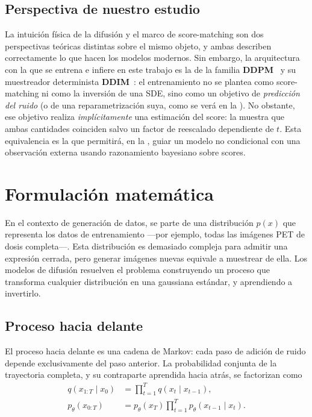 \subsection{Perspectiva de nuestro estudio}
\label{subsec:aplica-hoy}

La intuición física de la difusión y el marco de score-matching son
dos perspectivas teóricas distintas sobre el mismo objeto, y ambas
describen correctamente lo que hacen los modelos modernos. Sin
embargo, la arquitectura con la que se entrena e infiere en
este trabajo es la de la familia \textbf{DDPM}~\cite{ho2020ddpm} y su
muestreador determinista \textbf{DDIM}~\cite{song2021ddim}: el
entrenamiento no se plantea como score-matching ni como la inversión
de una SDE, sino como un objetivo de \emph{predicción del ruido} (o de
una reparametrización suya, como se verá en la
). No obstante, ese objetivo realiza
\emph{implícitamente} una estimación del score: la
 muestra que ambas cantidades coinciden salvo un
factor de reescalado dependiente de $t$. Esta equivalencia es la que
permitirá, en la , guiar un modelo
no condicional con una observación externa usando razonamiento
bayesiano sobre scores.

\section{Formulación matemática}
\label{sec:formulacion-difusion}

En el contexto de generación de datos, se parte de una distribución
$p(x)$ que representa los datos de entrenamiento —por ejemplo, todas
las imágenes PET de dosis completa—. Esta distribución es demasiado
compleja para admitir una expresión cerrada, pero generar imágenes
nuevas equivale a muestrear de ella. Los modelos de difusión
resuelven el problema construyendo un proceso que transforma
cualquier distribución en una gaussiana estándar, y aprendiendo a
invertirlo.

\subsection{Proceso hacia delante}
\label{subsec:forward}

El proceso hacia delante es una cadena de Markov: cada paso de
adición de ruido depende exclusivamente del paso anterior. La
probabilidad conjunta de la trayectoria completa, y su contraparte
aprendida hacia atrás, se factorizan como
\begin{align}
    q(x_{1:T} \mid x_0)
        &= \prod_{t=1}^{T} q(x_t \mid x_{t-1}),
        \label{eq:forward-chain}\\
    p_\theta(x_{0:T})
        &= p_\theta(x_T) \prod_{t=1}^{T} p_\theta(x_{t-1} \mid x_t).
        \label{eq:reverse-chain}
\end{align}

